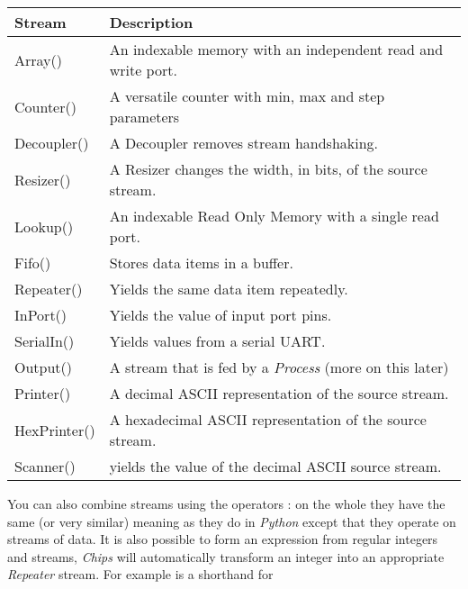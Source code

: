 \documentclass[letterpaper,10pt,english]{sphinxmanual}
\begin{document}
\begin{tabulary}{\linewidth}{|L|L|}
\hline
\textbf{
Stream
} & \textbf{
Description
}\\
\hline

Array()
 & 
An indexable memory with an independent read and write
port.
\\

Counter()
 & 
A versatile counter with min, max and step parameters
\\

Decoupler()
 & 
A Decoupler removes stream handshaking.
\\

Resizer()
 & 
A Resizer changes the width, in bits, of the source
stream.
\\

Lookup()
 & 
An indexable Read Only Memory with a single read port.
\\

Fifo()
 & 
Stores data items in a buffer.
\\

Repeater()
 & 
Yields the same data item repeatedly.
\\

InPort()
 & 
Yields the value of input port pins.
\\

SerialIn()
 & 
Yields values from a serial UART.
\\

Output()
 & 
A stream that is fed by a \emph{Process} (more on this later)
\\

Printer()
 & 
A decimal ASCII representation of the source stream.
\\

HexPrinter()
 & 
A hexadecimal ASCII representation of the source stream.
\\

Scanner()
 & 
yields the value of the decimal ASCII source stream.
\\
\hline
\end{tabulary}


You can also combine streams using the operators :  on the whole they have the same (or
very similar) meaning as they do in \emph{Python} except that they operate on streams
of data. It is also possible to form an expression from regular integers and
streams, \emph{Chips} will automatically transform an integer into an appropriate
\emph{Repeater} stream. For example  is a shorthand for
\end{document}
